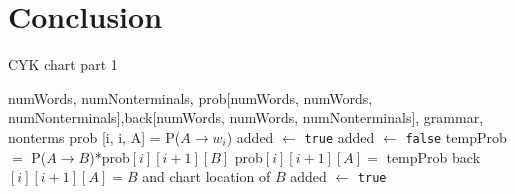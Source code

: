 \documentclass[11pt,twocolumn]{article}
\begin{document}
\section{Conclusion}





\nocite{*}

\begin{algorithm*}[!htb]
\caption{CYK chart part 1}
\label{cyk1}
\begin{algorithmic}[1]
\Require numWords, numNonterminals, prob[numWords, numWords, numNonterminals],\newline back[numWords, numWords, numNonterminals], grammar, nonterms
             \State prob [i, i, A] = P($A \rightarrow w_i$)
             \EndIf
		\State added $\gets$ \texttt{true}
			\State added $\gets$ \texttt{false}
					\State tempProb $=$ P($A \rightarrow B$)*prob$[i][i+1][B]$
						\State prob$[i][i+1][A] =$ tempProb
						\State back$[i][i+1] [A] = B$ and chart location of $B$
						\State added $\gets$ \texttt{true}
					\EndIf
				\EndIf
			\EndFor
		\EndWhile
\EndFor
\EndFor
\EndProcedure
{}
\end{algorithmic}
\end{algorithm*}
\end{document}
